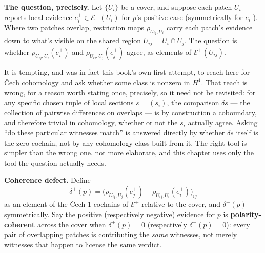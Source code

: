 \textbf{The question, precisely.} Let \(\{U_i\}\) be a cover, and suppose each
patch \(U_i\) reports local evidence \(e^+_i \in \mathcal{E}^+(U_i)\) for
\(p\)'s positive case (symmetrically for \(e^-_i\)). Where two patches
overlap, restriction maps \(\rho_{U_{ij}, U_i}\) carry each patch's evidence
down to what's visible on the shared region \(U_{ij} = U_i \cap U_j\). The
question is whether \(\rho_{U_{ij},U_i}(e^+_i)\) and \(\rho_{U_{ij},U_j}(e^+_j)\)
agree, as elements of \(\mathcal{E}^+(U_{ij})\).

It is tempting, and was in fact this book's own first attempt, to reach
here for Čech cohomology and ask whether some class is nonzero in
\(H^1\). That reach is wrong, for a reason worth stating once, precisely,
so it need not be revisited: for any specific chosen tuple of local
sections \(s = (s_i)\), the comparison \(\delta s\) --- the collection of
pairwise differences on overlaps --- is by construction a coboundary, and
therefore trivial in cohomology, whether or not the \(s_i\) actually agree.
Asking ``do these particular witnesses match'' is answered directly by
whether \(\delta s\) itself is the zero cochain, not by any cohomology
class built from it. The right tool is simpler than the wrong one, not
more elaborate, and this chapter uses only the tool the question actually
needs.

\textbf{Coherence defect.} Define
\[\delta^+(p) = \big(\rho_{U_{ij},U_j}(e^+_j) - \rho_{U_{ij},U_i}(e^+_i)\big)_{ij}\]
as an element of the Čech 1-cochains of \(\mathcal{E}^+\) relative to the
cover, and \(\delta^-(p)\) symmetrically. Say the positive (respectively
negative) evidence for \(p\) is \textbf{polarity-coherent} across the cover when
\(\delta^+(p) = 0\) (respectively \(\delta^-(p) = 0\)): every pair of
overlapping patches is contributing the \emph{same} witnesses, not merely
witnesses that happen to license the same verdict.

